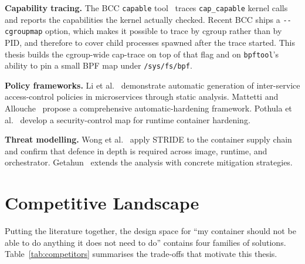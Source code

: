 \textbf{Capability tracing.} The BCC \texttt{capable} tool~\cite{bcc2025} traces \texttt{cap\_capable} kernel calls and reports the capabilities the kernel actually checked. Recent BCC ships a \texttt{-{}-cgroupmap} option, which makes it possible to trace by cgroup rather than by PID, and therefore to cover child processes spawned after the trace started. This thesis builds the cgroup-wide cap-trace on top of that flag and on \texttt{bpftool}'s ability to pin a small BPF map under \texttt{/sys/fs/bpf}.

\textbf{Policy frameworks.} Li et al.~\cite{li2021} demonstrate automatic generation of inter-service access-control policies in microservices through static analysis. Mattetti and Allouche~\cite{mattetti2020} propose a comprehensive automatic-hardening framework. Pothula et al.~\cite{pothula2019} develop a security-control map for runtime container hardening.

\textbf{Threat modelling.} Wong et al.~\cite{wong2023} apply STRIDE to the container supply chain and confirm that defence in depth is required across image, runtime, and orchestrator. Getahun~\cite{getahun2021} extends the analysis with concrete mitigation strategies.

\section{Competitive Landscape}\label{sec:competitive}

Putting the literature together, the design space for ``my container should not be able to do anything it does not need to do'' contains four families of solutions. Table~\ref{tab:competitors} summarises the trade-offs that motivate this thesis.

